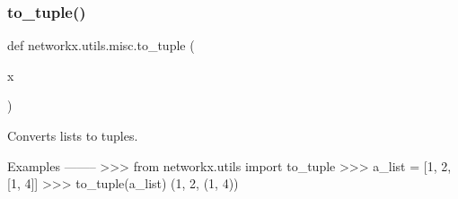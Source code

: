 \mbox{\label{namespacenetworkx_1_1utils_1_1misc_aef864bf26463af0cf2e41b0797365789}} 
\subsubsection{\texorpdfstring{to\+\_\+tuple()}{to\_tuple()}}
{\footnotesize\ttfamily def networkx.\+utils.\+misc.\+to\+\_\+tuple (\begin{DoxyParamCaption}\item[{}]{x }\end{DoxyParamCaption})}

\begin{DoxyVerb}Converts lists to tuples.

Examples
--------
>>> from networkx.utils import to_tuple
>>> a_list = [1, 2, [1, 4]]
>>> to_tuple(a_list)
(1, 2, (1, 4))
\end{DoxyVerb}
 